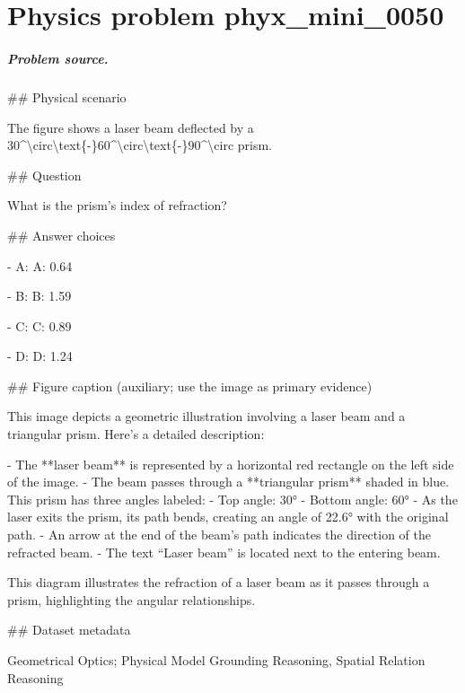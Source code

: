 
\chapter{Physics problem phyx\_mini\_0050}
\label{ch:PhyXMiniProblems_problem_phyx_mini_0050}

\paragraph{Problem source.}
\#\# Physical scenario

The figure shows a laser beam deflected by a 30\textasciicircum{}\textbackslash{}circ\textbackslash{}text\{-\}60\textasciicircum{}\textbackslash{}circ\textbackslash{}text\{-\}90\textasciicircum{}\textbackslash{}circ prism.

\#\# Question

What is the prism’s index of refraction?

\#\# Answer choices

- A: A: 0.64

- B: B: 1.59

- C: C: 0.89

- D: D: 1.24

\#\# Figure caption (auxiliary; use the image as primary evidence)

This image depicts a geometric illustration involving a laser beam and a triangular prism. Here's a detailed description:

- The **laser beam** is represented by a horizontal red rectangle on the left side of the image.
- The beam passes through a **triangular prism** shaded in blue. This prism has three angles labeled: 
  - Top angle: 30°
  - Bottom angle: 60°
- As the laser exits the prism, its path bends, creating an angle of 22.6° with the original path.
- An arrow at the end of the beam's path indicates the direction of the refracted beam.
- The text “Laser beam” is located next to the entering beam.

This diagram illustrates the refraction of a laser beam as it passes through a prism, highlighting the angular relationships.

\#\# Dataset metadata

Geometrical Optics; Physical Model Grounding Reasoning, Spatial Relation Reasoning


